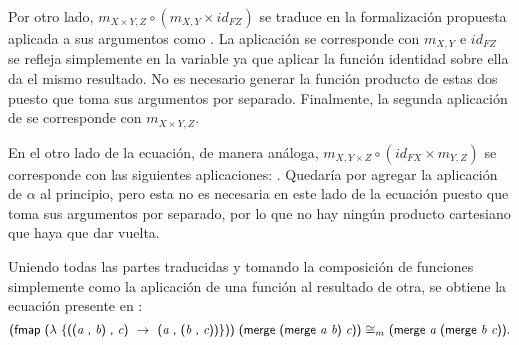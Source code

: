 Por otro lado, $m_{X \times Y, Z} \circ (m_{X,Y} \times id_{\mathit{F}Z})$ se traduce  en la formalización propuesta aplicada a sus argumentos como \AgdaSymbol{(} \AgdaSymbol{(} \AgdaSymbol{)} \AgdaSymbol{))}. La aplicación \AgdaSymbol{(} \AgdaSymbol{)} se corresponde con $m_{X,Y}$ e $id_{\mathit{F}Z}$ se refleja simplemente en la variable  ya que aplicar la función identidad sobre ella da el mismo resultado. No es necesario generar la función producto de estas dos puesto que  toma sus argumentos por separado. Finalmente, la segunda aplicación de  se corresponde con $m_{X \times Y, Z}$.

En el otro lado de la ecuación, de manera análoga, $m_{X, Y \times Z} \circ (id_{\mathit{F}X} \times m_{Y,Z})$ se corresponde con las siguientes aplicaciones: \AgdaSymbol{(}  \AgdaSymbol{(} \AgdaSymbol{))}. Quedaría por agregar la aplicación de $\alpha$ al principio, pero esta no es necesaria en este lado de la ecuación puesto que  toma sus argumentos por separado, por lo que no hay ningún producto cartesiano que haya que dar vuelta.

Uniendo todas las partes traducidas y tomando la composición de funciones simplemente como la aplicación de una función al resultado de otra, se obtiene la ecuación presente en :
\begin{equation*}
\AgdaSymbol{(}\AgdaField{fmap} \ \AgdaSymbol{($\lambda \ \{$((}\AgdaBound{a} \ \AgdaInductiveConstructor{,} \ \AgdaBound{b}\AgdaSymbol{)} \ \AgdaInductiveConstructor{,} \ \AgdaBound{c}\AgdaSymbol{) \ $\rightarrow$ \ (}\AgdaBound{a} \ \AgdaInductiveConstructor{,} \ \AgdaSymbol{(}\AgdaBound{b} \ \AgdaInductiveConstructor{,} \ \AgdaBound{c}\AgdaSymbol{))\}))} \ \AgdaSymbol{(}\AgdaField{merge} \ \AgdaSymbol{(}\AgdaField{merge} \ \AgdaBound{a b}\AgdaSymbol{)} \  \AgdaBound{c}\AgdaSymbol{))} \ \AgdaField{$\cong_m$} \ \AgdaSymbol{(}\AgdaField{merge} \ \AgdaBound{a} \ \AgdaSymbol{(}\AgdaField{merge} \ \AgdaBound{b c}\AgdaSymbol{))}.
\end{equation*}

